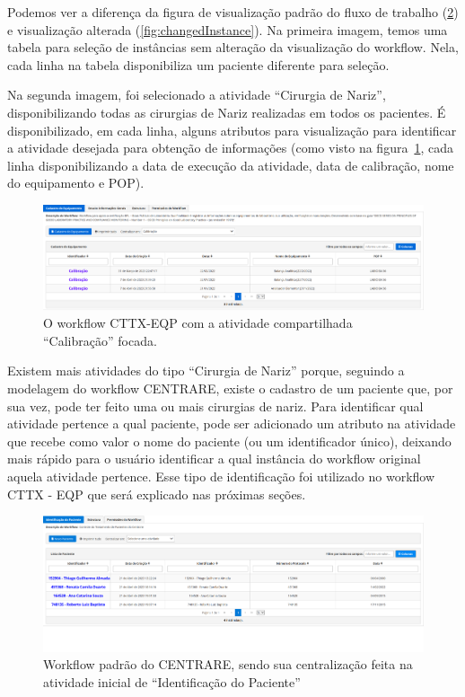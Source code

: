 Podemos ver a diferença da figura de visualização padrão do fluxo de trabalho (\ref{fig:normalInstance}) e visualização alterada (\ref{fig:changedInstance}). Na primeira imagem, temos uma tabela para seleção de instâncias sem alteração da visualização do workflow. Nela, cada linha na tabela disponibiliza um paciente diferente para seleção.

Na segunda imagem, foi selecionado a atividade ``Cirurgia de Nariz'', disponibilizando todas as cirurgias de Nariz realizadas em todos os pacientes. É disponibilizado, em cada linha, alguns atributos para visualização para identificar a atividade desejada para obtenção de informações (como visto na figura~\ref{fig:cttx_eqp_calibracao_focada}, cada linha disponibilizando a data de execução da atividade, data de calibração, nome do equipamento e POP).

\begin{figure}
    \centering
    \includegraphics[width=1\textwidth]{imgs/CTTX-EQP/cttx_eqp_calibracao_focada.png}
    \caption{O workflow CTTX-EQP com a atividade compartilhada ``Calibração'' focada.}
    \label{fig:cttx_eqp_calibracao_focada}
\end{figure}

Existem mais atividades do tipo ``Cirurgia de Nariz'' porque, seguindo a modelagem do workflow CENTRARE, existe o cadastro de um paciente que, por sua vez, pode ter feito uma ou mais cirurgias de nariz. Para identificar qual atividade pertence a qual paciente, pode ser adicionado um atributo na atividade que recebe como valor o nome do paciente (ou um identificador único), deixando mais rápido para o usuário identificar a qual instância do workflow original aquela atividade pertence. Esse tipo de identificação foi utilizado no workflow CTTX - EQP que será explicado nas próximas seções.

\begin{figure}
    \centering
    \includegraphics[width=1\textwidth]{imgs/CENTRARE/instanciaNormal.png}
    \caption{Workflow padrão do CENTRARE, sendo sua centralização feita na atividade inicial de ``Identificação do Paciente''}
    \label{fig:normalInstance}
\end{figure}

